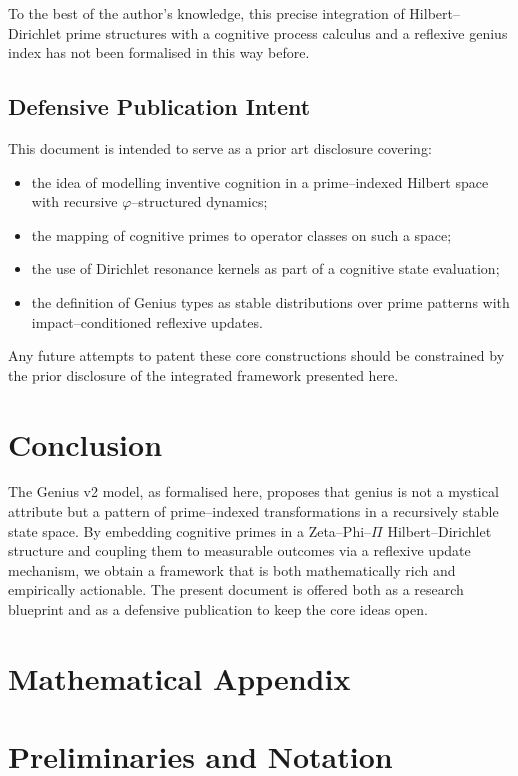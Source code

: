 \documentclass[11pt]{article}
\begin{document}
To the best of the author's knowledge, this precise integration of Hilbert--Dirichlet prime structures with a cognitive process calculus and a reflexive genius index has not been formalised in this way before.

\subsection{Defensive Publication Intent}

This document is intended to serve as a prior art disclosure covering:
\begin{itemize}[nosep]
  \item the idea of modelling inventive cognition in a prime--indexed Hilbert space with recursive $\varphi$--structured dynamics;
  \item the mapping of cognitive primes to operator classes on such a space;
  \item the use of Dirichlet resonance kernels as part of a cognitive state evaluation;
  \item the definition of Genius types as stable distributions over prime patterns with impact--conditioned reflexive updates.
\end{itemize}

Any future attempts to patent these core constructions should be constrained by the prior disclosure of the integrated framework presented here.

\section{Conclusion}

The Genius v2 model, as formalised here, proposes that genius is not a mystical attribute but a pattern of prime--indexed transformations in a recursively stable state space.
By embedding cognitive primes in a Zeta--Phi--$\Pi$ Hilbert--Dirichlet structure and coupling them to measurable outcomes via a reflexive update mechanism, we obtain a framework that is both mathematically rich and empirically actionable.
The present document is offered both as a research blueprint and as a defensive publication to keep the core ideas open.

\appendix
\section*{Mathematical Appendix}
\setcounter{section}{0}

\section{Preliminaries and Notation}
\end{document}
